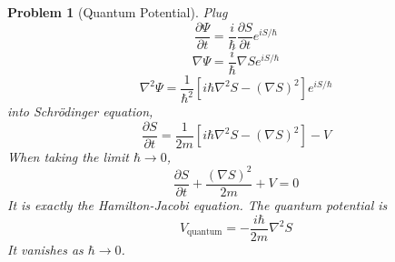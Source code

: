 \documentclass{article}
\theoremstyle{t}
\newtheorem{problem}{Problem}
\newcommand{\pa}{\partial}
\begin{document}
\begin{problem}[Quantum Potential]
    Plug
    \begin{equation}
        \frac{\pa \Psi}{\pa t}=\frac{i}{\hbar}\frac{\pa S}{\pa t}e^{iS/\hbar}
    \end{equation}
    \begin{equation}
        \nabla \Psi=\frac{i}{\hbar} \nabla S e^{iS/\hbar}
    \end{equation}
    \begin{equation}
        \nabla^2 \Psi=\frac{1}{\hbar^2}\left[i\hbar \nabla^2 S-\left(\nabla S\right)^2\right]e^{iS/\hbar}
    \end{equation}
    into Schrödinger equation,
    \begin{equation}
        \frac{\pa S}{\pa t}=\frac{1}{2m}\left[i\hbar \nabla^2 S-\left(\nabla S\right)^2\right]-V
    \end{equation}
    When taking the limit $\hbar\rightarrow 0$,
    \begin{equation}
        \frac{\pa S}{\pa t}+\frac{\left(\nabla S\right)^2 }{2m}+V=0
    \end{equation}
    It is exactly the Hamilton-Jacobi equation. The quantum potential is 
    \begin{equation}
        \boxed{V_{\text{quantum}}=-\frac{i\hbar}{2m}\nabla^2S}
    \end{equation}
    It vanishes as $\hbar\rightarrow 0$.
\end{problem}
\end{document}

